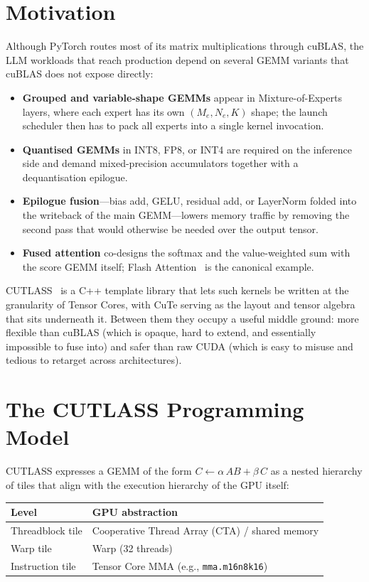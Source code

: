 \section{Motivation}\label{sec:cutlass_motivation}
Although PyTorch routes most of its matrix multiplications through
cuBLAS, the LLM workloads that reach production depend on several
GEMM variants that cuBLAS does not expose directly:
\begin{itemize}
    \item \textbf{Grouped and variable-shape GEMMs} appear in
          Mixture-of-Experts layers, where each expert has its own
          $(M_e, N_e, K)$ shape; the launch scheduler then has to
          pack all experts into a single kernel invocation.
    \item \textbf{Quantised GEMMs} in INT8, FP8, or INT4 are
          required on the inference side and demand mixed-precision
          accumulators together with a dequantisation epilogue.
    \item \textbf{Epilogue fusion}---bias add, GELU, residual add,
          or LayerNorm folded into the writeback of the main
          GEMM---lowers memory traffic by removing the second pass
          that would otherwise be needed over the output tensor.
    \item \textbf{Fused attention} co-designs the softmax and the
          value-weighted sum with the score GEMM itself; Flash
          Attention~\cite{dao2022flashattention} is the canonical
          example.
\end{itemize}
CUTLASS~\cite{cutlass} is a C++ template library that lets such
kernels be written at the granularity of Tensor Cores, with CuTe
serving as the layout and tensor algebra that sits underneath it.
Between them they occupy a useful middle ground: more flexible
than cuBLAS (which is opaque, hard to extend, and essentially
impossible to fuse into) and safer than raw CUDA (which is easy to
misuse and tedious to retarget across architectures).

\section{The CUTLASS Programming Model}\label{sec:cutlass_model}
CUTLASS expresses a GEMM of the form
$C \leftarrow \alpha\, A B + \beta\, C$ as a nested hierarchy of
tiles that align with the execution hierarchy of the GPU itself:

\begin{center}
\begin{tabular}{ll}
\textbf{Level} & \textbf{GPU abstraction} \\
\toprule
Threadblock tile & Cooperative Thread Array (CTA) / shared memory \\
Warp tile        & Warp (32 threads) \\
Instruction tile & Tensor Core MMA (e.g., \texttt{mma.m16n8k16}) \\
\bottomrule
\end{tabular}
\end{center}

